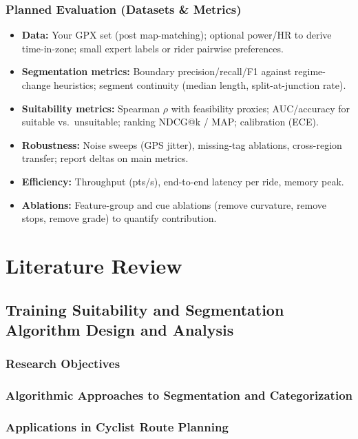 \documentclass[11pt,twoside]{report}
\begin{document}
\subsection{Planned Evaluation (Datasets \& Metrics)}
\begin{itemize}[leftmargin=2.2em]
	\item \textbf{Data:} Your GPX set (post map-matching); optional power/HR to derive time-in-zone; small expert labels or rider pairwise preferences.
	\item \textbf{Segmentation metrics:} Boundary precision/recall/F1 against regime-change heuristics; segment continuity (median length, split-at-junction rate).
	\item \textbf{Suitability metrics:} Spearman $\rho$ with feasibility proxies; AUC/accuracy for suitable vs.\ unsuitable; ranking NDCG@k / MAP; calibration (ECE).
	\item \textbf{Robustness:} Noise sweeps (GPS jitter), missing-tag ablations, cross-region transfer; report deltas on main metrics.
	\item \textbf{Efficiency:} Throughput (pts/s), end-to-end latency per ride, memory peak.
	\item \textbf{Ablations:} Feature-group and cue ablations (remove curvature, remove stops, remove grade) to quantify contribution.
\end{itemize}

\chapter{Literature Review}
\label{chap:litreview}

\section{Training Suitability and Segmentation Algorithm Design and Analysis}

\subsection{Research Objectives}
\subsection{Algorithmic Approaches to Segmentation and Categorization}
\subsection{Applications in Cyclist Route Planning}
\end{document}
